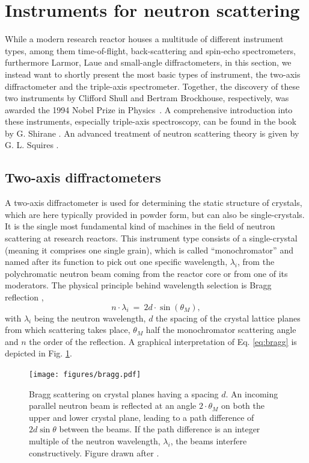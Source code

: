\section{Instruments for neutron scattering \label{sec:instruments}}

While a modern research reactor houses a multitude of different instrument types, among them time-of-flight, back-scattering and spin-echo spectrometers, furthermore Larmor, Laue and small-angle diffractometers, in this section, we instead want to shortly present the most basic types of instrument, the two-axis diffractometer and the triple-axis spectrometer. Together, the discovery of these two instruments by Clifford Shull and Bertram Brockhouse, respectively, was awarded the 1994 Nobel Prize in Physics~\cite{web_nobel1994}. A comprehensive introduction into these instruments, especially triple-axis spectroscopy, can be found in the book by G. Shirane \cite{Shirane2002}. An advanced treatment of neutron scattering theory is given by G. L. Squires \cite{Squires2012}.


\subsection{Two-axis diffractometers}

A two-axis diffractometer is used for determining the static structure of crystals, which are here typically provided in powder form, but can also be single-crystals. It is the single most fundamental kind of machines in the field of neutron scattering at research reactors. This instrument type consists of a single-crystal (meaning it comprises one single grain), which is called ``monochromator'' and named after its function to pick out one specific wavelength, $\lambda_i$, from the polychromatic neutron beam coming from the reactor core or from one of its moderators. The physical principle behind wavelength selection is Bragg reflection \cite[p. 68]{Gross2012} \cite[p. 13]{Shirane2002},
\begin{equation}
	\label{eq:bragg}
	n \cdot \lambda_i \ =\  2 d \cdot \sin\left( \theta_M \right),
\end{equation}
with $\lambda_i$ being the neutron wavelength, $d$ the spacing of the crystal lattice planes from which scattering takes place, $\theta_M$ half the monochromator scattering angle and $n$ the order of the reflection. A graphical interpretation of Eq. \ref{eq:bragg} is depicted in Fig. \ref{fig:braggscattering}.

\begin{figure}[htb]
	\centering
	\texttt{[image: figures/bragg.pdf]}
	\caption{Bragg scattering on crystal planes having a spacing $d$. An incoming parallel neutron beam is reflected at an angle $2 \cdot \theta_M$ on both the upper and lower crystal plane, leading to a path difference of $2d \sin\theta$ between the beams. If the path difference is an integer multiple of the neutron wavelength, $\lambda_i$, the beams interfere constructively. Figure drawn after \cite[p. 68, Fig. 2.7]{Gross2012}. }
	\label{fig:braggscattering}
\end{figure}

